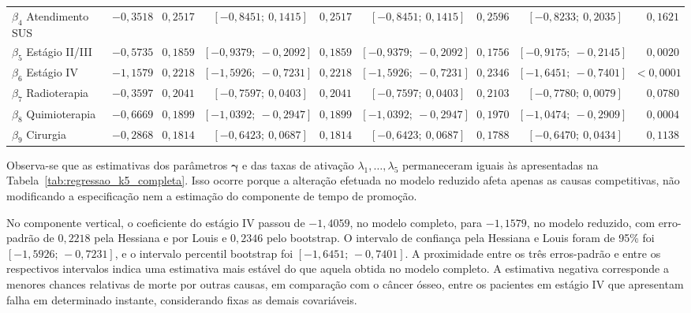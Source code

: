 \documentclass[11pt,a4paper]{article}
\begin{document}
\begin{table}[H]
\begin{adjustbox}{max width=\textwidth}
\begin{tabular}{@{}lrrrrrrrr@{}}
$\beta_{4}$ Atendimento SUS & $-0{,}3518$ & $0{,}2517$ & $[-0{,}8451;\ 0{,}1415]$ & $0{,}2517$ & $[-0{,}8451;\ 0{,}1415]$ & $0{,}2596$ & $[-0{,}8233;\ 0{,}2035]$ & $0{,}1621$ \\
$\beta_{5}$ Estágio II/III & $-0{,}5735$ & $0{,}1859$ & $[-0{,}9379;\ -0{,}2092]$ & $0{,}1859$ & $[-0{,}9379;\ -0{,}2092]$ & $0{,}1756$ & $[-0{,}9175;\ -0{,}2145]$ & $0{,}0020$ \\
$\beta_{6}$ Estágio IV & $-1{,}1579$ & $0{,}2218$ & $[-1{,}5926;\ -0{,}7231]$ & $0{,}2218$ & $[-1{,}5926;\ -0{,}7231]$ & $0{,}2346$ & $[-1{,}6451;\ -0{,}7401]$ & $<0{,}0001$ \\
$\beta_{7}$ Radioterapia & $-0{,}3597$ & $0{,}2041$ & $[-0{,}7597;\ 0{,}0403]$ & $0{,}2041$ & $[-0{,}7597;\ 0{,}0403]$ & $0{,}2103$ & $[-0{,}7780;\ 0{,}0079]$ & $0{,}0780$ \\
$\beta_{8}$ Quimioterapia & $-0{,}6669$ & $0{,}1899$ & $[-1{,}0392;\ -0{,}2947]$ & $0{,}1899$ & $[-1{,}0392;\ -0{,}2947]$ & $0{,}1970$ & $[-1{,}0474;\ -0{,}2909]$ & $0{,}0004$ \\
$\beta_{9}$ Cirurgia & $-0{,}2868$ & $0{,}1814$ & $[-0{,}6423;\ 0{,}0687]$ & $0{,}1814$ & $[-0{,}6423;\ 0{,}0687]$ & $0{,}1788$ & $[-0{,}6470;\ 0{,}0434]$ & $0{,}1138$ \\
\bottomrule
\end{tabular}
\end{adjustbox}
\endgroup
\end{table}


Observa-se que as estimativas dos parâmetros $\bm\gamma$ e das taxas de ativação $\lambda_1,\ldots,\lambda_5$ permaneceram iguais às apresentadas na Tabela~\ref{tab:regressao_k5_completa}. Isso ocorre porque a alteração efetuada no modelo reduzido afeta apenas as causas competitivas, não modificando a especificação nem a estimação do componente de tempo de promoção. 

No componente vertical, o coeficiente do estágio IV passou de $-1{,}4059$, no modelo completo, para $-1{,}1579$, no modelo reduzido, com erro-padrão de $0{,}2218$ pela Hessiana e por Louis e $0{,}2346$ pelo bootstrap. O intervalo de confiança pela Hessiana e Louis foram de 95\% foi $[-1{,}5926;\,-0{,}7231]$, e o intervalo percentil bootstrap foi $[-1{,}6451;\,-0{,}7401]$. A proximidade entre os três erros-padrão e entre os respectivos intervalos indica uma estimativa mais estável do que aquela obtida no modelo completo. A estimativa negativa corresponde a menores chances relativas de morte por outras causas, em comparação com o câncer ósseo, entre os pacientes em estágio IV que apresentam falha em determinado instante, considerando fixas as demais covariáveis.
\end{document}
